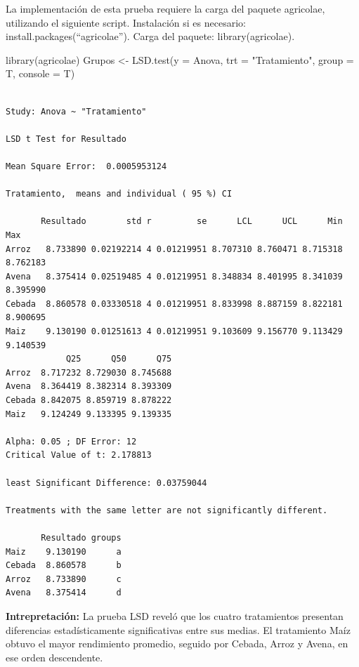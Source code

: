 \documentclass[
  spanish,
  letterpaper,
  DIV=11,
  numbers=noendperiod]{scrreprt}
\newenvironment{Shaded}{\begin{snugshade}}{\end{snugshade}}
\newcommand{\AttributeTok}[1]{\textcolor[rgb]{0.40,0.45,0.13}{#1}}
\newcommand{\FunctionTok}[1]{\textcolor[rgb]{0.28,0.35,0.67}{#1}}
\newcommand{\NormalTok}[1]{\textcolor[rgb]{0.00,0.23,0.31}{#1}}
\newcommand{\OtherTok}[1]{\textcolor[rgb]{0.00,0.23,0.31}{#1}}
\newcommand{\StringTok}[1]{\textcolor[rgb]{0.13,0.47,0.30}{#1}}
\begin{document}
La implementación de esta prueba requiere la carga del paquete
agricolae, utilizando el siguiente script. Instalación si es necesario:
install.packages(``agricolae''). Carga del paquete: library(agricolae).

\begin{Shaded}
\begin{Highlighting}[]
\FunctionTok{library}\NormalTok{(agricolae)}
\NormalTok{Grupos }\OtherTok{\textless{}{-}} \FunctionTok{LSD.test}\NormalTok{(}\AttributeTok{y =}\NormalTok{ Anova, }\AttributeTok{trt =} \StringTok{"Tratamiento"}\NormalTok{, }\AttributeTok{group =}\NormalTok{ T, }\AttributeTok{console =}\NormalTok{ T)}
\end{Highlighting}
\end{Shaded}

\begin{verbatim}

Study: Anova ~ "Tratamiento"

LSD t Test for Resultado 

Mean Square Error:  0.0005953124 

Tratamiento,  means and individual ( 95 %) CI

       Resultado        std r         se      LCL      UCL      Min      Max
Arroz   8.733890 0.02192214 4 0.01219951 8.707310 8.760471 8.715318 8.762183
Avena   8.375414 0.02519485 4 0.01219951 8.348834 8.401995 8.341039 8.395990
Cebada  8.860578 0.03330518 4 0.01219951 8.833998 8.887159 8.822181 8.900695
Maiz    9.130190 0.01251613 4 0.01219951 9.103609 9.156770 9.113429 9.140539
            Q25      Q50      Q75
Arroz  8.717232 8.729030 8.745688
Avena  8.364419 8.382314 8.393309
Cebada 8.842075 8.859719 8.878222
Maiz   9.124249 9.133395 9.139335

Alpha: 0.05 ; DF Error: 12
Critical Value of t: 2.178813 

least Significant Difference: 0.03759044 

Treatments with the same letter are not significantly different.

       Resultado groups
Maiz    9.130190      a
Cebada  8.860578      b
Arroz   8.733890      c
Avena   8.375414      d
\end{verbatim}

\textbf{Intrepretación:} La prueba LSD reveló que los cuatro
tratamientos presentan diferencias estadísticamente significativas entre
sus medias. El tratamiento Maíz obtuvo el mayor rendimiento promedio,
seguido por Cebada, Arroz y Avena, en ese orden descendente.
\end{document}

